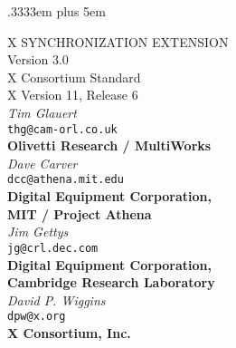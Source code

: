 
\newcommand{\cfunctionname}[1]{\mbox{\tt#1}}
\newcommand{\ctypename}[1]{\mbox{\tt#1}}
\newcommand{\cconst}[1]{\mbox{\tt#1}}
\newcommand{\cargname}[1]{\mbox{\it#1}}
\newcommand{\cstartfunction}[2]{\begin{sloppypar}\begin{samepage}\ctypename{#1}\\ \cfunctionname{#2}\ (}
\newcommand{\cargdecl}[2]{\penalty -1\ctypename{#1} \cargname{#2}}
\newcommand{\cendfunctiondecl}{){\hangafter=2 \hangindent=20pt \raggedright\par}}
\newcommand{\cendfuncdescription}{\end{samepage}\end{sloppypar}}

\newcommand{\cstartmacro}[2]{\begin{sloppypar}\begin{samepage}\ctypename{#1}\\ \cfunctionname{#2}\ (}
\newcommand{\cendmacrodecl}{)\par}
\newcommand{\cendmacrodescription}{\end{samepage}\end{sloppypar}}

\spaceskip .3333em plus 5em



\begin{center}

{\large X SYNCHRONIZATION EXTENSION}\\[10pt]
{\large Version 3.0}\\[15pt]
{\large X Consortium Standard}\\[15pt]
{\large X Version 11, Release 6}\\[15pt]
{\it Tim Glauert}\\[0pt]
{\tt thg@cam-orl.co.uk}\\[0pt]
{\bf Olivetti Research / MultiWorks}\\[5pt]
{\it Dave Carver}\\[0pt]
{\tt dcc@athena.mit.edu}\\[0pt]
{\bf Digital Equipment Corporation,}\\[0pt]
{\bf MIT / Project Athena}\\[5pt]
{\it Jim Gettys}\\[0pt]
{\tt jg@crl.dec.com}\\[0pt]
{\bf Digital Equipment Corporation,}\\[0pt]
{\bf Cambridge Research Laboratory}\\[5pt]
{\it David P. Wiggins}\\[0pt]
{\tt dpw@x.org}\\[0pt]
{\bf X Consortium, Inc.}\\[0pt]

\end {center}

